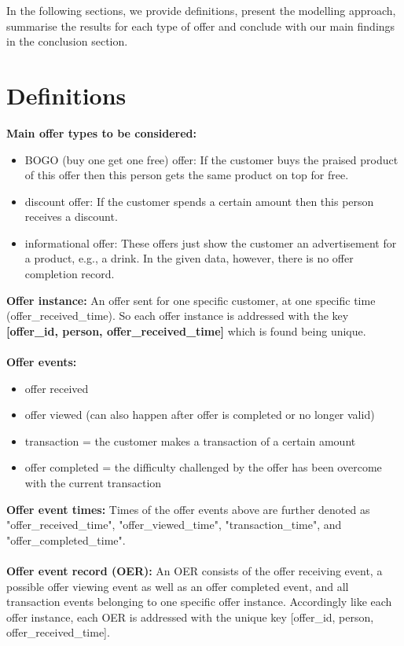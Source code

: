 \documentclass[11pt]{article} %
\begin{document}
In the following sections, we provide definitions, present the modelling approach, summarise the results for each type of offer and conclude with our main findings in the conclusion section.


\section{Definitions}
\textbf{Main offer types to be considered:}
\begin{itemize}
\item BOGO (buy one get one free) offer: If the customer buys the praised product of this offer then this person gets the same product on top for free.
\item discount offer: If the customer spends a certain amount then this person receives a discount.
\item informational offer: These offers just show the customer an advertisement for a product, e.g., a drink. In the given data, however, there is no offer completion record.
\end{itemize}
\noindent\textbf{Offer instance:} 
An offer sent for one specific customer, at one specific time (offer\_received\_time). So each offer instance is addressed with the key \textbf{[offer\_id, person, offer\_received\_time]} which is found being unique.
\\
\\
\noindent\textbf{Offer events:} 
\begin{itemize}
\item offer received
\item offer viewed (can also happen after offer is completed or no longer valid)
\item transaction = the customer makes a transaction of a certain amount 
\item offer completed = the difficulty challenged by the offer has been overcome with the current transaction
\end{itemize}
\noindent\textbf{Offer event times:} 
Times of the offer events above are further denoted as "offer\_received\_time", "offer\_viewed\_time", "transaction\_time", and "offer\_completed\_time".
\\
\\
\textbf{Offer event record (OER): } An OER consists of the offer receiving event, a possible offer viewing event as well as an offer completed event, and all transaction events belonging to one specific offer instance.
Accordingly like each offer instance, each OER is addressed with the unique key [offer\_id, person, offer\_received\_time].
\end{document}
